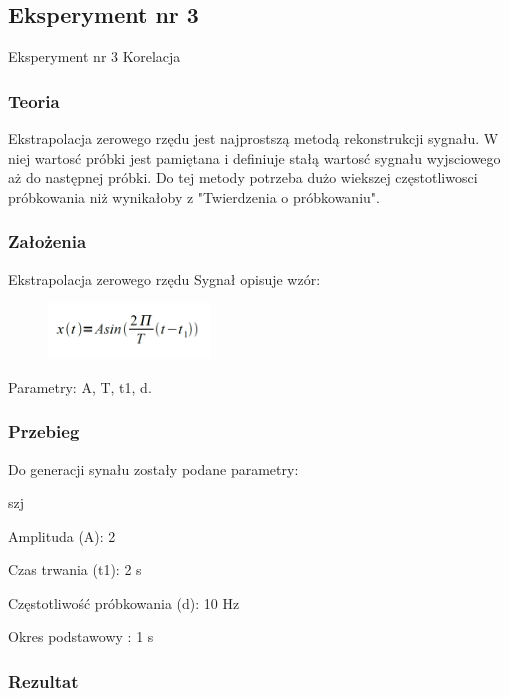 \documentclass[12pt]{article}
\begin{document}
\subsection{Eksperyment nr 3}

Eksperyment nr 3  Korelacja

\subsubsection{Teoria}
Ekstrapolacja zerowego rzędu jest najprostszą metodą rekonstrukcji sygnału. W  niej wartosć próbki jest pamiętana i definiuje stałą wartosć sygnału wyjsciowego aż do następnej próbki. Do tej metody potrzeba dużo wiekszej częstotliwosci próbkowania niż wynikałoby z "Twierdzenia o próbkowaniu". 

\subsubsection{Założenia}
Ekstrapolacja zerowego rzędu
Sygnał opisuje wzór:

\begin{figure}[h!]
 \centering
 \includegraphics[width=4.3cm]{SinWzor.PNG}
 \vspace{-0.3cm}
 \label{gw}
\end{figure}

Parametry: A, T, t1, d.


\subsubsection{Przebieg}
Do generacji synału zostały podane parametry:

\begin{labeling}{szj}
\item [Amplituda (A):] 2
\item [Czas trwania (t1):] 2 s
\item [Częstotliwość próbkowania (d): ] 10 Hz
\item [Okres podstawowy :] 1 s
\end{labeling}


\subsubsection{Rezultat}
\end{document}
